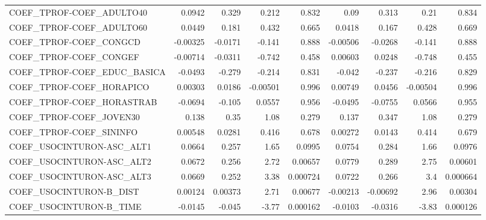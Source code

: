 \begin{tabular}{lrrrrrrrr}
COEF\_TPROF-COEF\_ADULTO40          &      0.0942 &        0.329 &    0.212 &    0.832 &       0.09 &       0.313 &         0.21 &         0.834 \\
COEF\_TPROF-COEF\_ADULTO60          &      0.0449 &        0.181 &    0.432 &    0.665 &     0.0418 &       0.167 &        0.428 &         0.669 \\
COEF\_TPROF-COEF\_CONGCD            &    -0.00325 &      -0.0171 &   -0.141 &    0.888 &   -0.00506 &     -0.0268 &       -0.141 &         0.888 \\
COEF\_TPROF-COEF\_CONGEF            &    -0.00714 &      -0.0311 &   -0.742 &    0.458 &    0.00603 &      0.0248 &       -0.748 &         0.455 \\
COEF\_TPROF-COEF\_EDUC\_BASICA       &     -0.0493 &       -0.279 &   -0.214 &    0.831 &     -0.042 &      -0.237 &       -0.216 &         0.829 \\
COEF\_TPROF-COEF\_HORAPICO          &     0.00303 &       0.0186 & -0.00501 &    0.996 &    0.00749 &      0.0456 &     -0.00504 &         0.996 \\
COEF\_TPROF-COEF\_HORASTRAB         &     -0.0694 &       -0.105 &   0.0557 &    0.956 &    -0.0495 &     -0.0755 &       0.0566 &         0.955 \\
COEF\_TPROF-COEF\_JOVEN30           &       0.138 &         0.35 &     1.08 &    0.279 &      0.137 &       0.347 &         1.08 &         0.279 \\
COEF\_TPROF-COEF\_SININFO           &     0.00548 &       0.0281 &    0.416 &    0.678 &    0.00272 &      0.0143 &        0.414 &         0.679 \\
COEF\_USOCINTURON-ASC\_ALT1         &      0.0664 &        0.257 &     1.65 &   0.0995 &     0.0754 &       0.284 &         1.66 &        0.0976 \\
COEF\_USOCINTURON-ASC\_ALT2         &      0.0672 &        0.256 &     2.72 &  0.00657 &     0.0779 &       0.289 &         2.75 &       0.00601 \\
COEF\_USOCINTURON-ASC\_ALT3         &      0.0669 &        0.252 &     3.38 & 0.000724 &     0.0722 &       0.266 &          3.4 &      0.000664 \\
COEF\_USOCINTURON-B\_DIST           &     0.00124 &      0.00373 &     2.71 &  0.00677 &   -0.00213 &    -0.00692 &         2.96 &       0.00304 \\
COEF\_USOCINTURON-B\_TIME           &     -0.0145 &       -0.045 &    -3.77 & 0.000162 &    -0.0103 &     -0.0316 &        -3.83 &      0.000126 \\

\end{tabular}
